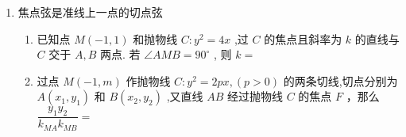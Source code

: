 \begin{enumerate}
\begin{enumerate}
\begin{jieda}
\begin{enumerate}
                设 $M\left( {\dfrac{{y}_{1}^{2}}{4},{y}_{1}}\right) ,N\left( {\dfrac{{y}_{2}^{2}}{4},{y}_{2}}\right) ,A\left( {\dfrac{{y}_{3}^{2}}{4},{y}_{3}}\right) ,B\left( {\dfrac{{y}_{4}^{2}}{4},{y}_{4}}\right)$
                
                由斜率公式可得 ${k}_{MN} = \dfrac{{y}_{1} - {y}_{2}}{\dfrac{{y}_{1}^{2}}{4} - \dfrac{{y}_{2}^{2}}{4}} = \dfrac{4}{{y}_{1} + {y}_{2}},{k}_{AB} = \dfrac{{y}_{3} - {y}_{4}}{\dfrac{{y}_{3}^{2}}{4} - \dfrac{{y}_{4}^{2}}{4}} = \dfrac{4}{{y}_{3} + {y}_{4}}$
                
                设直线 ${MN} : x = {m_1y} + 1$，代入抛物线方程可得 ${y}^{2} - {4m_1y} - 4 = 0, \Delta  > 0,{y}_{1}{y}_{2} =  - 4$
    
                设直线 ${MD} : x = m_2 y + 2$ ,代入抛物线方程可得 ${y}^{2} - 4m_2 y - 8 = 0, \Delta  > 0,{y}_{1}{y}_{3} =  - 8$ ,所以 ${y}_{3} = 2{y}_{2}$ ,同理可得 ${y}_{4} = 2{y}_{1}$
                
                所以 ${k}_{AB} = \dfrac{4}{{y}_{3} + {y}_{4}} = \dfrac{4}{2\left( {{y}_{1} + {y}_{2}}\right) } = \dfrac{{k}_{MN}}{2}$
                
                故$\tan \left( {\alpha  - \beta }\right)  = \dfrac{\tan \alpha  - \tan \beta }{1 + \tan \alpha \tan \beta } = \dfrac{k_{AB}}{1 + 2{k^2_{AB}}} \in \left[-\dfrac{\sqrt{2}}{4}, \dfrac{\sqrt{2}}{4}\right]$，当且仅当$k_{AB} = \dfrac{\sqrt{2}}{2}$ 时取得最大值，所以当 $\alpha  - \beta$ 最大时, ${k}_{AB} = \dfrac{\sqrt{2}}{2}$ ,设直线 ${AB} : x = \sqrt{2}y + n$，代入抛物线方程可得 ${y}^{2} - 4\sqrt{2}y - {4n} = 0$，${y}_{3}{y}_{4} =  - {4n} = 4{y}_{1}{y}_{2} =  - {16}$ ,所以 $n = 4$，故直线 ${AB} : x = \sqrt{2}y + 4$ .
    
                \ps 对于抛物线$y^2 = 2px$，当抛物线的弦过定点$(t,0)$时，弦的端点纵坐标之积为定值：$-2pt$
            \end{enumerate}
        \end{jieda}
    \end{enumerate}
    \item 焦点弦是准线上一点的切点弦
    \begin{enumerate}
        \item 已知点 $M\left( {-1,1}\right)$ 和抛物线 $C : {y}^2 = {4x}$ ,过 $C$ 的焦点且斜率为 $k$ 的直线与 $C$ 交于 $A,B$ 两点. 若 $\angle {AMB} = {90}^{ \circ  }$ , 则 $k =$ 

        \item 过点 $M\left( {-1,m}\right)$ 作抛物线 $C : {y}^2 = {2px},\left( {p > 0}\right)$ 的两条切线,切点分别为 $A\left( {{x}_1,{y}_1}\right)$ 和 $B\left( {{x}_2,{y}_2}\right)$ ,又直线 ${AB}$ 经过抛物线 $C$ 的焦点 $F$ ，那么 $\dfrac{{y}_1{y}_2}{{k}_{MA}{k}_{MB}} =$ 


\end{enumerate}
\end{enumerate}
